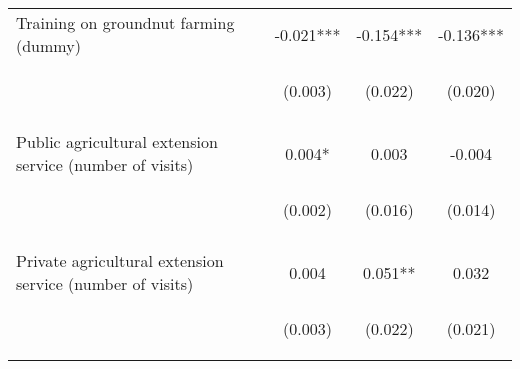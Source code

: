 \begin{center}
\begin{tabular}{lccc}
Training on groundnut farming (dummy) & -0.021*** & -0.154*** & -0.136*** \\
 & \begin{footnotesize}(0.003)\end{footnotesize} & \begin{footnotesize}(0.022)\end{footnotesize} & \begin{footnotesize}(0.020)\end{footnotesize} \\
\vspace{4pt} & \begin{footnotesize}[0.000]\end{footnotesize} & \begin{footnotesize}[0.000]\end{footnotesize} & \begin{footnotesize}[0.000]\end{footnotesize} \\
Public agricultural extension service (number of visits) & 0.004* & 0.003 & -0.004 \\
 & \begin{footnotesize}(0.002)\end{footnotesize} & \begin{footnotesize}(0.016)\end{footnotesize} & \begin{footnotesize}(0.014)\end{footnotesize} \\
\vspace{4pt} & \begin{footnotesize}[0.052]\end{footnotesize} & \begin{footnotesize}[0.849]\end{footnotesize} & \begin{footnotesize}[0.771]\end{footnotesize} \\
Private agricultural extension service (number of visits) & 0.004 & 0.051** & 0.032 \\
 & \begin{footnotesize}(0.003)\end{footnotesize} & \begin{footnotesize}(0.022)\end{footnotesize} & \begin{footnotesize}(0.021)\end{footnotesize} \\

\end{tabular}
\end{center}
